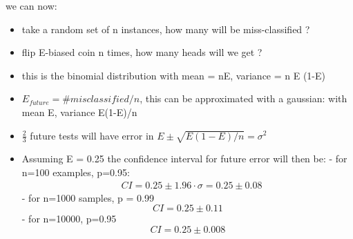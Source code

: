 \documentclass{article}
\begin{document}
{    we can now:
    \begin{itemize}[noitemsep]
        \item take a random set of n instances, how many will be miss-classified ?
        \item flip E-biased coin n times, how many heads will we get ?
        \item this is the binomial distribution with mean = nE, variance = n E (1-E)
        \item $E_{future} = \# misclassified / n$, this can be approximated with a gaussian: with mean E, variance E(1-E)/n
        \item $\frac{2}{3}$ future tests will have error in $E \pm \sqrt{E(1-E)/n} = \sigma^{2}$
        \item Assuming E = 0.25 the confidence interval for future error will then be:
            \subitem- for n=100 examples, p=0.95: 
                \begin{equation}
                    \begin{aligned}
                        &CI = 0.25 \pm 1.96 \cdot \sigma = 0.25 \pm 0.08
                    \end{aligned}
                \end{equation}   
            \subitem- for n=1000 samples, p = 0.99
            \begin{equation}
                CI = 0.25 \pm 0.11 
            \end{equation}
            \subitem- for n=10000, p=0.95
            \begin{equation}
                CI = 0.25 \pm 0.008
            \end{equation}
    \end{itemize}
    }

\end{document}
